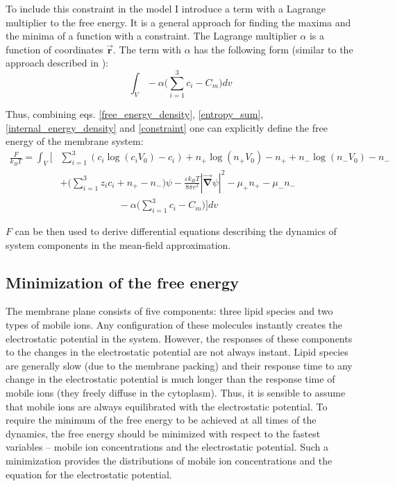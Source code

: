 To include this constraint in the model I introduce a term with a Lagrange multiplier to the free energy. It is a general approach for finding the maxima and the minima of a function with a constraint. The Lagrange multiplier $\alpha$ is a function of coordinates $\vec{\mathbf{r}}$. The term with $\alpha$ has the following form (similar to the approach described in \cite{May2000}):
\begin{equation}
 \label{constraint}\int_V-\alpha\Big(\sum_{i=1}^3 c_i - C_m\Big)dv
\end{equation}

Thus, combining eqs. \eqref{free_energy_density}, \eqref{entropy_sum}, \eqref{internal_energy_density} and \eqref{constraint} one can explicitly define the free energy of the membrane system:
\begin{align}
\label{free_energy_density_detailed_minimization}\frac{F}{k_BT}= \int_V\Big[&\sum_{i=1}^3(c_i\log({c_i V_0})-c_i) + n_+ \log({n_+  V_0}) - n_+ + n_- \log({n_-  V_0}) - n_- \nonumber \\
&+ \Big(\sum_{i=1}^3 z_i c_i + n_+ - n_-\Big)\psi - \frac{\varepsilon k_BT}{8\pi e^2}|\vec{\mathbf{\nabla}} \psi|^2 - \mu_+n_+ - \mu_-n_- \nonumber \\
&\hspace{1in}- \alpha\Big(\sum_{i=1}^3 c_i - C_m\Big)\Big]dv
\end{align}

$F$ can be then used to derive differential equations describing the dynamics of system components in the mean-field approximation.

\subsection{Minimization of the free energy}

The membrane plane consists of five components: three lipid species and two types of mobile ions. Any configuration of these molecules instantly creates the electrostatic potential in the system. However, the responses of these components to the changes in the electrostatic potential are not always instant. Lipid species are generally slow (due to the membrane packing) and their response time to any change in the electrostatic potential is much longer than the response time of mobile ions (they freely diffuse in the cytoplasm). Thus, it is sensible to assume that mobile ions are always equilibrated with the electrostatic potential. To require the minimum of the free energy to be achieved at all times of the dynamics, the free energy should be minimized with respect to the fastest variables -- mobile ion concentrations and the electrostatic potential. Such a minimization provides the distributions of mobile ion concentrations and the equation for the electrostatic potential.


